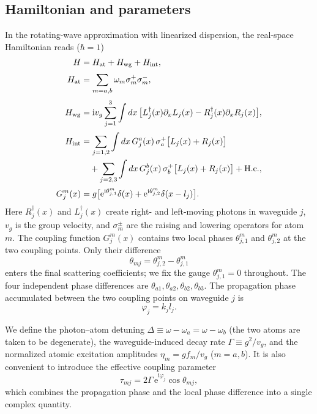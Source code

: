 \documentclass[aps,pra,reprint,superscriptaddress,nofootinbib,longbibliography,floatfix]{revtex4-2}
\newcommand{\ii}{\mathrm{i}}
\newcommand{\ee}{\mathrm{e}}
\newcommand{\Del}{\Delta}
\newcommand{\Gam}{\Gamma}
\newcommand{\ph}{\varphi}
\begin{document}
\subsection{Hamiltonian and parameters}

In the rotating-wave approximation with linearized dispersion, the real-space Hamiltonian reads ($\hbar=1$)
\begin{subequations}
\label{eq:H}
\begin{align}
H &= H_{\rm at} + H_{\rm wg} + H_{\rm int},\\[2pt]
H_{\rm at} &= \sum_{m=a,b} \omega_m \sigma_m^+ \sigma_m^-,\\[2pt]
H_{\rm wg} &= \ii v_g \sum_{j=1}^3 \int dx\,
\bigl[L_j^\dagger(x)\partial_x L_j(x) - R_j^\dagger(x)\partial_x R_j(x)\bigr],\\[2pt]
H_{\rm int} &= \sum_{j=1,2} \int dx\, G_j^a(x)\,\sigma_a^+\bigl[L_j(x)+R_j(x)\bigr] \nonumber\\
&\quad + \sum_{j=2,3} \int dx\, G_j^b(x)\,\sigma_b^+\bigl[L_j(x)+R_j(x)\bigr] + \mathrm{H.c.},\\[2pt]
G_j^m(x) &= g\bigl[\ee^{\ii\theta^m_{j,1}}\delta(x) + \ee^{\ii\theta^m_{j,2}}\delta(x-l_j)\bigr].
\end{align}
\end{subequations}
Here $R_j^\dagger(x)$ and $L_j^\dagger(x)$ create right- and left-moving photons in waveguide $j$, $v_g$ is the group velocity, and $\sigma_m^\pm$ are the raising and lowering operators for atom $m$.
The coupling function $G_j^m(x)$ contains two local phases $\theta^m_{j,1}$ and $\theta^m_{j,2}$ at the two coupling points.
Only their difference
\begin{equation}
  \theta_{mj} = \theta^m_{j,2} - \theta^m_{j,1}
\end{equation}
enters the final scattering coefficients; we fix the gauge $\theta^m_{j,1}=0$ throughout.
The four independent phase differences are $\theta_{a1},\theta_{a2},\theta_{b2},\theta_{b3}$.
The propagation phase accumulated between the two coupling points on waveguide $j$ is
\begin{equation}
  \ph_j = k_j l_j .
\end{equation}

We define the photon--atom detuning $\Del \equiv \omega-\omega_a = \omega-\omega_b$ (the two atoms are taken to be degenerate), the waveguide-induced decay rate $\Gam \equiv g^2/v_g$, and the normalized atomic excitation amplitudes $\eta_m = g f_m / v_g$ ($m=a,b$).
It is also convenient to introduce the effective coupling parameter
\begin{equation}
  \tau_{mj} = 2\Gam\,\ee^{\ii\ph_j}\cos\theta_{mj},
\end{equation}
which combines the propagation phase and the local phase difference into a single complex quantity.
\end{document}
